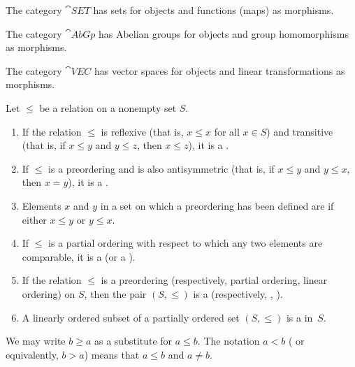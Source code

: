\begin{exam} The category
$\cat{SET}$ has sets for objects and functions (maps) as morphisms.
\end{exam}

\begin{exam} The category
$\cat{AbGp}$ has Abelian groups for objects and group homomorphisms as morphisms.
\end{exam}

\begin{exam} The category
$\cat{VEC}$ has vector spaces for objects and linear transformations as morphisms.
\end{exam}







\begin{defn}\label{C008111} Let $\le$ be a relation on a nonempty set $S$.
 \begin{enumerate}
  \item If the relation
 $\le$ is reflexive (that is, $x \le x$ for all $x \in S$) and transitive (that is, if $x \le y$ and $y \le z$, then $x  \le z$), it is a
.
  \item If $\le$ is a preordering and is also antisymmetric (that is, if $x \le y$ and $y \le x$, then $x = y$), it is a
.
  \item Elements $x$ and $y$ in a set on which a preordering has been defined are
 if either $x \le y$ or $y \le x$.
  \item If $\le$ is a partial ordering with respect to which any two elements are comparable, it is a
 (or a
).
  \item If the relation $\le$ is a preordering (respectively, partial ordering,
linear ordering) on $S$, then the pair $(S,\le)$ is a
 (respectively,
,
).
  \item A linearly ordered subset of a partially ordered set $(S,\le)$ is a
 in~$S$.
 \end{enumerate}
We may write $b \ge a$ as a substitute for $a \le b$.  The notation
$a < b$ ( or equivalently, $b > a$) means that $a \le b$ and $a \ne b$.
\end{defn}

